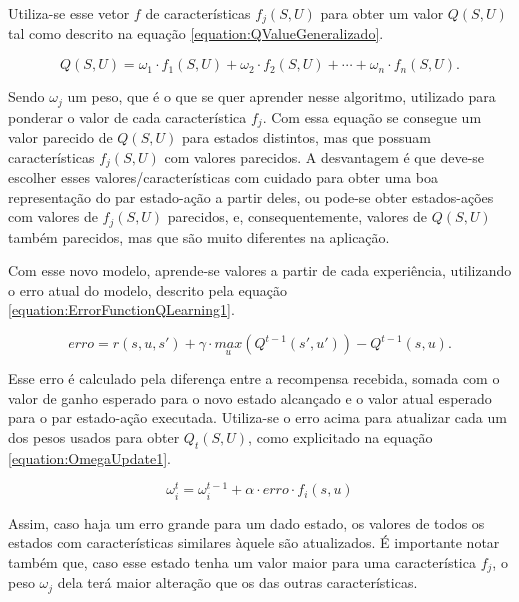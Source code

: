 Utiliza-se esse vetor $ f $ de características $ f_j \left( S, U \right) $ para obter um valor $ Q \left( S, U \right) $ tal como descrito na equação \ref{equation:QValueGeneralizado}.

\begin{equation} \label{equation:QValueGeneralizado}
	Q \left( S, U \right) = \omega_1 \cdot f_1 \left( S, U \right) + \omega_2 \cdot f_2 \left( S, U \right) + \cdots + \omega_n \cdot f_n \left( S, U \right).
\end{equation}

Sendo $ \omega_j $ um peso, que é o que se quer aprender nesse algoritmo, utilizado para ponderar o valor de cada característica $ f_j $. Com essa equação se consegue um valor parecido de $ Q \left( S, U \right) $ para estados distintos, mas que possuam características $ f_j \left( S, U \right) $ com valores parecidos. A desvantagem é que deve-se escolher esses valores/características com cuidado para obter uma boa representação do par estado-ação a partir deles, ou pode-se obter estados-ações com valores de $ f_j \left( S, U \right)$ parecidos, e, consequentemente, valores de $ Q \left( S, U \right) $ também parecidos, mas que são muito diferentes na aplicação.

Com esse novo modelo, aprende-se valores a partir de cada experiência, utilizando o erro atual do modelo, descrito pela equação \ref{equation:ErrorFunctionQLearning1}.

\begin{equation} \label{equation:ErrorFunctionQLearning1}
	erro = r \left( s, u, s' \right) + \gamma \cdot \underset{u}{max} \left( Q^{t-1} \left( s', u' \right) \right) - Q^{t-1} \left( s, u \right).
\end{equation}

Esse erro é calculado pela diferença entre a recompensa recebida, somada com o valor de ganho esperado para o novo estado alcançado e o valor atual esperado para o par estado-ação executada. Utiliza-se o erro acima para atualizar cada um dos pesos usados para obter $ Q_t \left( S, U \right) $, como explicitado na equação \ref{equation:OmegaUpdate1}.

\begin{equation} \label{equation:OmegaUpdate1}
	\omega_i^t = \omega_i^{t-1} + \alpha \cdot erro \cdot f_i \left( s, u \right)
\end{equation}

Assim, caso haja um erro grande para um dado estado, os valores de todos os estados com características similares àquele são atualizados. É importante notar também que, caso esse estado tenha um valor maior para uma característica $ f_j $, o peso $ \omega_j $ dela terá maior alteração que os das outras características.

